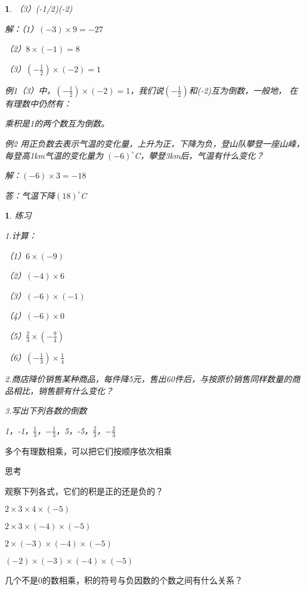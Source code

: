 \documentclass{article}
\newtheorem{exercise}{ }
\newtheorem{example}{ }
\begin{document}
\begin{article}
\begin{example}
（3）(-1/2)\times(-2)

解：（1）$(-3)\times9=-27$

（2）$8\times(-1)=8$

（3）$(-\frac{1}{2})\times(-2)=1$

例1（3）中，$(-\frac{1}{2})\times(-2)=1$，我们说$(-\frac{1}{2})$和(-2)互为倒数，一般地，
在有理数中仍然有：

\begin{definition}
乘积是1的两个数互为倒数。
\end{definition}

例2 用正负数去表示气温的变化量，上升为正，下降为负，登山队攀登一座山峰，每登高1km气温的变化量为
$(-6)^\circ$C，攀登3km后，气温有什么变化？

解：$(-6)\times3=-18$

答：气温下降$(18)^\circ$C

\end{example}

\begin{exercise}

练习

1.计算：

（1）$6\times(-9)$

（2）$(-4)\times6$

（3）$(-6)\times(-1)$

（4）$(-6)\times0$

（5）$\frac{2}{3}\times(-\frac{9}{4})$

（6）$(-\frac{1}{3})\times\frac{1}{4}$

2.商店降价销售某种商品，每件降5元，售出60件后，与按原价销售同样数量的商品相比，销售额有什么变化？

3.写出下列各数的倒数

1，-1，$\frac{1}{3}$，$-\frac{1}{3}$，5，-5，$\frac{2}{3}$，$-\frac{2}{3}$

\end{exercise}

多个有理数相乘，可以把它们按顺序依次相乘

思考

观察下列各式，它们的积是正的还是负的？

$2\times3\times4\times(-5)$

$2\times3\times(-4)\times(-5)$

$2\times(-3)\times(-4)\times(-5)$

$(-2)\times(-3)\times(-4)\times(-5)$

几个不是0的数相乘，积的符号与负因数的个数之间有什么关系？


\end{article}
\end{document}
